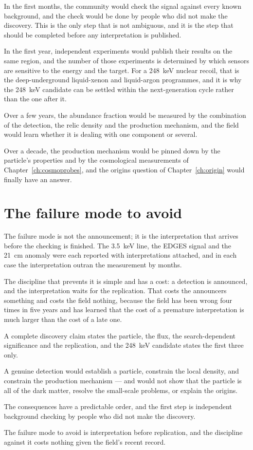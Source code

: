 In the first months, the community would check the signal against every
known background, and the check would be done by people who did not make the
discovery. This is the only step that is not ambiguous, and it is the step
that should be completed before any interpretation is published.

In the first year, independent experiments would publish their results on
the same region, and the number of those experiments is determined by which
sensors are sensitive to the energy and the target. For a 248~keV nuclear
recoil, that is the deep-underground liquid-xenon and liquid-argon
programmes, and it is why the 248~keV candidate can be settled within the
next-generation cycle rather than the one after it.

Over a few years, the abundance fraction would be measured by the
combination of the detection, the relic density and the production
mechanism, and the field would learn whether it is dealing with one
component or several.

Over a decade, the production mechanism would be pinned down by the
particle's properties and by the cosmological measurements of
Chapter~\ref{ch:cosmoprobes}, and the origins question of
Chapter~\ref{ch:origin} would finally have an answer.

\section{The failure mode to avoid}The failure mode is not the announcement; it is
the interpretation that arrives before the checking is finished. The 3.5~keV
line, the EDGES signal and the 21~cm anomaly were each reported with
interpretations attached, and in each case the interpretation outran the
measurement by months.

The discipline that prevents it is simple and has a cost: a detection is
announced, and the interpretation waits for the replication. That costs the
announcers something and costs the field nothing, because the field has
been wrong four times in five years and has learned that the cost of a
premature interpretation is much larger than the cost of a late one.

\begin{keytakeaways}
\item A complete discovery claim states the particle, the flux, the
search-dependent significance and the replication, and the 248~keV
candidate states the first three only.
\item A genuine detection would establish a particle, constrain the local
density, and constrain the production mechanism --- and would not show that
the particle is all of the dark matter, resolve the small-scale problems, or
explain the origins.
\item The consequences have a predictable order, and the first step is
independent background checking by people who did not make the discovery.
\item The failure mode to avoid is interpretation before replication, and the
discipline against it costs nothing given the field's recent record.
\end{keytakeaways}
